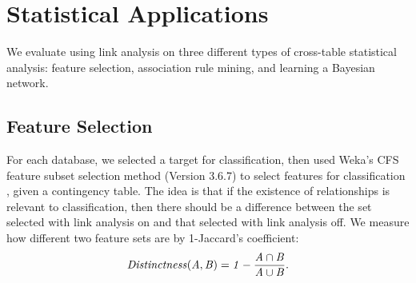 \documentclass{sig-alternate-2013}
\begin{document}
\section{Statistical Applications}
We evaluate using link analysis on three different types of cross-table statistical analysis: feature selection, association rule  mining, and learning a Bayesian network.

\subsection{Feature Selection} For each database, we selected a target for classification, then used Weka's CFS feature subset selection method (Version 3.6.7) to select features for classification \cite{Hall2009}, given a contingency table. The idea is that if the existence of relationships is relevant to classification, then there should be a difference between the set selected with link analysis on and that selected with link analysis off. 
We measure how different two feature sets are by 1-Jaccard's coefficient:
$$\it{Distinctness}(A,B) = 1- \frac{A \cap B}{A \cup B}.$$


\begin{table}[htbp] \centering
\caption{Selected Features for Target variables for  Link Analysis Off vs. Link Analysis On. Rvars denotes the number of relationship features selected. 
\label{table:feature-select}}
\end{table}
\end{document}
